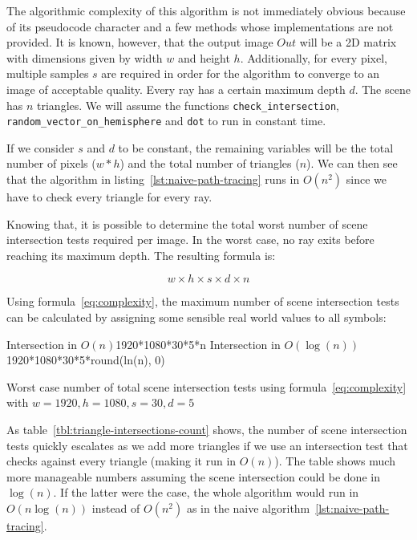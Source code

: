 \documentclass[
  twoside,
  11pt, a4paper,
  footinclude=true,
  headinclude=true,
  cleardoublepage=empty
]{scrreprt}
\begin{document}
\vspace{0.5cm}

The algorithmic complexity of this algorithm is not immediately obvious because of its pseudocode
character and a few methods whose implementations are not provided. It is known, however, that
the output image \(Out\) will be a 2D matrix with dimensions given by width \(w\) and height \(h\).
Additionally, for every pixel, multiple samples \(s\) are required in order for the algorithm to
converge to an image of acceptable quality. Every ray has a certain maximum depth \(d\).
The scene has \(n\) triangles. We will assume the functions \texttt{check\_intersection},
\texttt{random\_vector\_on\_hemisphere} and \texttt{dot} to run in constant time.

If we consider \(s\) and \(d\) to be constant, the remaining variables will be the total number of
pixels (\(w * h\)) and the total number of triangles (\(n\)). We can then see that the algorithm in
listing~\ref{lst:naive-path-tracing} runs in \(O(n^2)\) since we have to check every triangle for
every ray.

Knowing that, it is possible to determine the total worst number of scene intersection tests required per image.
In the worst case, no ray exits before reaching its maximum depth. The resulting formula is:

\begin{equation}\label{eq:complexity}
    w \times h \times s \times d \times n
\end{equation}

Using formula~\ref{eq:complexity}, the maximum number of scene intersection tests can be calculated
by assigning some sensible real world values to all symbols:

\begin{table}[H]
    \centering
                  {Intersection in \(O(n)\)}{1920*1080*30*5*n}
                  {Intersection in \(O(\log(n))\)}{1920*1080*30*5*round(ln(n), 0)}
    \caption{Worst case number of total scene intersection tests using
    formula~\ref{eq:complexity} with \(w=1920, h=1080, s=30, d=5\)}
    \label{tbl:triangle-intersections-count}
\end{table}

As table~\ref{tbl:triangle-intersections-count} shows, the number of scene intersection tests
quickly escalates as we add more triangles if we use an intersection test that checks
against every triangle (making it run in \(O(n)\)). The table shows much more manageable numbers assuming
the scene intersection could be done in \(\log(n)\).
If the latter were the case, the whole algorithm would run in \(O(n\log(n))\) instead of \(O(n^2)\)
as in the naive algorithm~\ref{lst:naive-path-tracing}.
\end{document}
